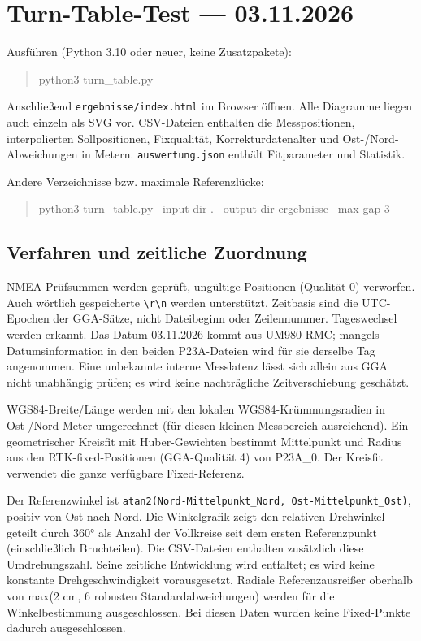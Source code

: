 \documentclass[11pt,a4paper]{article}
\begin{document}
\clearpage\section{Turn-Table-Test — 03.11.2026}

Ausführen (Python 3.10 oder neuer, keine Zusatzpakete):

\begin{quote}\ttfamily\footnotesize python3 turn\_table.py\end{quote}

Anschließend {\small\texttt{ergebnisse/\allowbreak{}index.html}} im Browser öffnen. Alle Diagramme liegen auch einzeln als SVG vor. CSV-Dateien enthalten die Messpositionen, interpolierten Sollpositionen, Fixqualität, Korrekturdatenalter und Ost-/Nord-Abweichungen in Metern. {\small\texttt{auswertung.json}} enthält Fitparameter und Statistik.

Andere Verzeichnisse bzw. maximale Referenzlücke:

\begin{quote}\ttfamily\footnotesize python3 turn\_table.py --input-dir . --output-dir ergebnisse --max-gap 3\end{quote}

\subsection{Verfahren und zeitliche Zuordnung}

NMEA-Prüfsummen werden geprüft, ungültige Positionen (Qualität 0) verworfen. Auch wörtlich gespeicherte {\small\texttt{\textbackslash{}r\textbackslash{}n}} werden unterstützt. Zeitbasis sind die UTC-Epochen der GGA-Sätze, nicht Dateibeginn oder Zeilennummer. Tageswechsel werden erkannt. Das Datum 03.11.2026 kommt aus UM980-RMC; mangels Datumsinformation in den beiden P23A-Dateien wird für sie derselbe Tag angenommen. Eine unbekannte interne Messlatenz lässt sich allein aus GGA nicht unabhängig prüfen; es wird keine nachträgliche Zeitverschiebung geschätzt.

WGS84-Breite/Länge werden mit den lokalen WGS84-Krümmungsradien in Ost-/Nord-Meter umgerechnet (für diesen kleinen Messbereich ausreichend). Ein geometrischer Kreisfit mit Huber-Gewichten bestimmt Mittelpunkt und Radius aus den RTK-fixed-Positionen (GGA-Qualität 4) von P23A\_0. Der Kreisfit verwendet die ganze verfügbare Fixed-Referenz.

Der Referenzwinkel ist {\small\texttt{atan2(Nord-Mittelpunkt\_\allowbreak{}Nord, Ost-Mittelpunkt\_\allowbreak{}Ost)}}, positiv von Ost nach Nord. Die Winkelgrafik zeigt den relativen Drehwinkel geteilt durch 360° als Anzahl der Vollkreise seit dem ersten Referenzpunkt (einschließlich Bruchteilen). Die CSV-Dateien enthalten zusätzlich diese Umdrehungszahl. Seine zeitliche Entwicklung wird entfaltet; es wird keine konstante Drehgeschwindigkeit vorausgesetzt. Radiale Referenzausreißer oberhalb von max(2 cm, 6 robusten Standardabweichungen) werden für die Winkelbestimmung ausgeschlossen. Bei diesen Daten wurden keine Fixed-Punkte dadurch ausgeschlossen.
\end{document}
